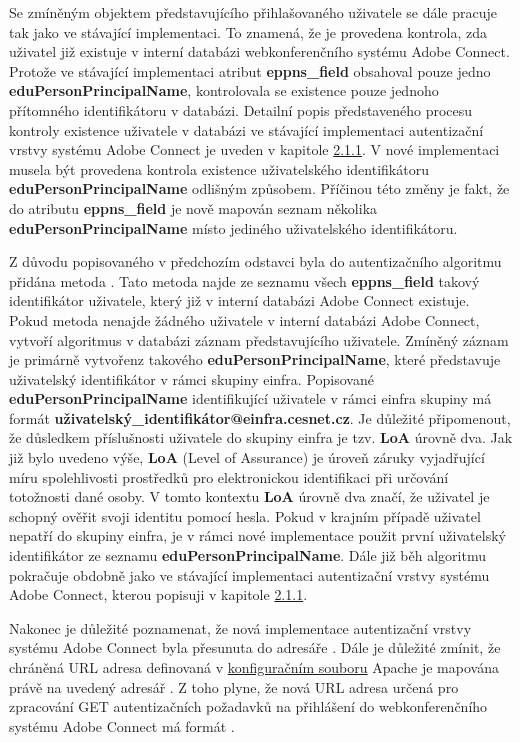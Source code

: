 \documentclass[
  printed, %
  twoside, %
  table,   %
  nolof,     %
  nolot,     %
]{fithesis3}
\begin{document}
Se zmíněným objektem představujícího přihlašovaného uživatele se dále pracuje tak jako ve stávající implementaci. To znamená, že je provedena kontrola, zda uživatel již existuje v interní databázi webkonferenčního systému Adobe Connect. Protože ve stávající implementaci atribut \textbf{eppns\_field} obsahoval pouze jedno \textbf{eduPersonPrincipalName}, kontrolovala se existence pouze jednoho přítomného identifikátoru v databázi. Detailní popis představeného procesu kontroly existence uživatele v databázi ve stávající implementaci autentizační vrstvy systému Adobe Connect je uveden v kapitole \hyperref[ac-old]{2.1.1}. V nové implementaci musela být provedena kontrola existence uživatelského identifikátoru \textbf{eduPersonPrincipalName} odlišným způsobem. Příčinou této změny je fakt, že do atributu \textbf{eppns\_field} je nově mapován seznam několika \textbf{eduPersonPrincipalName} místo jediného uživatelského identifikátoru.
\par
Z důvodu popisovaného v předchozím odstavci byla do autentizačního algoritmu přidána metoda . Tato metoda najde ze seznamu všech \textbf{eppns\_field} takový identifikátor uživatele, který již v interní databázi Adobe Connect existuje. Pokud metoda  nenajde žádného uživatele v interní databázi Adobe Connect, vytvoří algoritmus v databázi záznam představujícího uživatele. Zmíněný záznam je primárně vytvořen\break z takového \textbf{eduPersonPrincipalName}, které představuje uživatelský identifikátor v rámci skupiny einfra. Popisované \textbf{eduPersonPrincipalName} identifikující uživatele v rámci einfra skupiny má formát \textbf{{uživatelský\_identifikátor}@einfra.cesnet.cz}. Je důležité připomenout, že důsledkem příslušnosti uživatele do skupiny einfra je tzv. \textbf{LoA} úrovně dva. Jak již bylo uvedeno výše, \textbf{LoA} (Level of Assurance) \cite{rfc6711} je úroveň záruky vyjadřující míru spolehlivosti prostředků pro
elektronickou identifikaci při určování totožnosti dané osoby. V tomto kontextu \textbf{LoA} úrovně dva značí, že uživatel je schopný ověřit svoji identitu pomocí hesla.  Pokud v krajním případě uživatel nepatří do skupiny einfra, je v rámci nové implementace použit první uživatelský identifikátor ze seznamu \textbf{eduPersonPrincipalName}. Dále již běh algoritmu pokračuje obdobně jako ve stávající implementaci autentizační vrstvy systému Adobe Connect, kterou popisuji v kapitole \hyperref[ac-old]{2.1.1}. 


\par 
Nakonec je důležité poznamenat, že nová implementace autentizační vrstvy systému Adobe Connect byla přesunuta do adresáře . Dále je důležité zmínit, že chráněná URL adresa definovaná v \hyperref[ac-location]{konfiguračním souboru} Apache je mapována právě na uvedený adresář . Z toho plyne, že nová URL adresa určená pro zpracování GET autentizačních požadavků na přihlášení do webkonferenčního systému Adobe Connect má formát .
\end{document}
